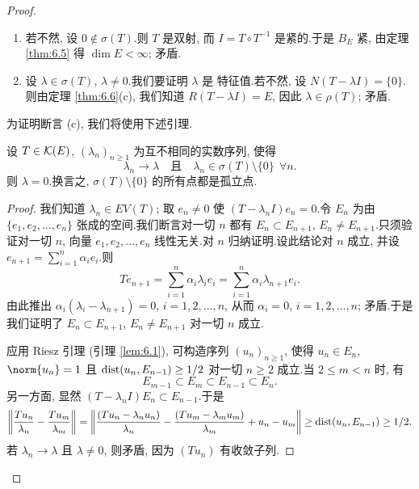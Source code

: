 \begin{proof}
\begin{enumerate}[label=(\alph*), leftmargin=2.2em, itemsep=0.3em]
	\item 若不然, 设 $0\notin\sigma(T)$.则 $T$ 是双射, 而
	      $I=T\circ T^{-1}$ 是紧的.于是 $B_E$ 紧, 由定理  \ref{thm:6.5} 得
	      $\dim E<\infty$; 矛盾.
	\item 设 $\lambda\in\sigma(T)$, $\lambda\ne0$.我们要证明 $\lambda$ 是
	      特征值.若不然, 设 $N(T-\lambda I)=\{0\}$.则由定理  \ref{thm:6.6}(c),
	      我们知道 $R(T-\lambda I)=E$, 因此 $\lambda\in\rho(T)$; 矛盾.
\end{enumerate}

为证明断言 (c), 我们将使用下述引理.

\begin{lemma}
\label{lem:6.2}
设 $T\in\mathcal{K}(E)$, $(\lambda_n)_{n\ge1}$ 为互不相同的实数序列, 使得
\begin{equation*}
\lambda_n\to\lambda\quad\text{且}\quad
\lambda_n\in\sigma(T)\setminus\{0\}\ \ \forall n.
\end{equation*}
则 $\lambda=0$.换言之, $\sigma(T)\setminus\{0\}$ 的所有点都是孤立点.
\end{lemma}

\begin{proof}
我们知道 $\lambda_n\in EV(T)$; 取 $e_n\ne0$ 使 $(T-\lambda_nI)e_n=0$.令
$E_n$ 为由 $\{e_1,e_2,\dots,e_n\}$ 张成的空间.我们断言对一切 $n$ 都有
$E_n\subset E_{n+1}$, $E_n\ne E_{n+1}$.只须验证对一切 $n$, 向量
$e_1,e_2,\dots,e_n$ 线性无关.对 $n$ 归纳证明.设此结论对 $n$ 成立, 并设
$e_{n+1}=\sum_{i=1}^n\alpha_ie_i$.则
\begin{equation*}
Te_{n+1}=\sum_{i=1}^n\alpha_i\lambda_ie_i
=\sum_{i=1}^n\alpha_i\lambda_{n+1}e_i.
\end{equation*}
由此推出 $\alpha_i(\lambda_i-\lambda_{n+1})=0$, $i=1,2,\dots,n$, 从而
$\alpha_i=0$, $i=1,2,\dots,n$; 矛盾.于是我们证明了
$E_n\subset E_{n+1}$, $E_n\ne E_{n+1}$ 对一切 $n$ 成立.

应用 Riesz 引理 (引理  \ref{lem:6.1}), 可构造序列 $(u_n)_{n\ge1}$, 使得
$u_n\in E_n$, $\norm{u_n}=1$ 且 $\operatorname{dist}(u_n,E_{n-1})\ge1/2$ 对一切 $n\ge2$
成立.当 $2\le m<n$ 时, 有
\begin{equation*}
E_{m-1}\subset E_m\subset E_{n-1}\subset E_n.
\end{equation*}
另一方面, 显然 $(T-\lambda_nI)E_n\subset E_{n-1}$.于是
\begin{equation*}
\left\|\frac{Tu_n}{\lambda_n}-\frac{Tu_m}{\lambda_m}\right\|
=\left\|\frac{(Tu_n-\lambda_nu_n)}{\lambda_n}
-\frac{(Tu_m-\lambda_mu_m)}{\lambda_m}+u_n-u_m\right\|
\ge\operatorname{dist}(u_n,E_{n-1})\ge1/2.
\end{equation*}
若 $\lambda_n\to\lambda$ 且 $\lambda\ne0$, 则矛盾, 因为 $(Tu_n)$ 有收敛子列.
\end{proof}


\end{proof}
